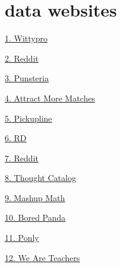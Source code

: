 \documentclass[12pt,reqno]{amsart}
\theoremstyle{plain}
\theoremstyle{definition}
\theoremstyle{remark}
\begin{document}



\section{data websites}
\href{https://wittypro.net/pick-up-lines/computer-programming-pick-up-lines-and-rizz/}{1. Wittypro}

\href{https://www.reddit.com/r/ProgrammerHumor/comments/oz77xb/programmer_pickup_lines_ive_collected_these_past/ }{2. Reddit}

\href{https://punsteria.com/computer-science-puns/  }{3. Punsteria}

\href{https://attractmorematches.com/computer-science-pick-up-lines/}{4. Attract More Matches}

\href{https://pickupline.net/academic-pick-lines/computer-programming-pick-up-lines/ }{5. Pickupline}

\href{https://www.rd.com/article/math-pickup-lines/ }{6. RD}

\href{https://www.reddit.com/r/math/comments/gy66d4/i_need_every_one_of_your_corniest_mathy_pick_up/ }{7. Reddit}

\href{https://thoughtcatalog.com/january-nelson/2021/05/math-pick-up-lines/ }{8. Thought Catalog}

\href{https://www.mashupmath.com/blog/math-pickup-lines }{9. Mashup Math}

\href{https://www.boredpanda.com/math-pick-up-lines/ }{10. Bored Panda}

\href{https://ponly.com/math-pickup-lines/ }{11. Ponly}

\href{https://www.weareteachers.com/math-jokes/}{12. We Are Teachers}
\end{document}

